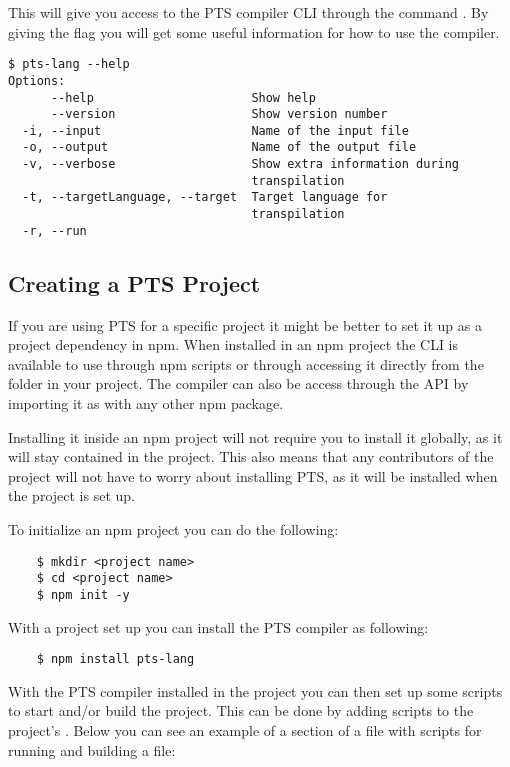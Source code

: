 This will give you access to the PTS compiler CLI through the command .
By giving the  flag you will get some useful information for how to use the compiler.

\begin{verbatim}
$ pts-lang --help
Options:
      --help                      Show help
      --version                   Show version number
  -i, --input                     Name of the input file
  -o, --output                    Name of the output file
  -v, --verbose                   Show extra information during
                                  transpilation
  -t, --targetLanguage, --target  Target language for
                                  transpilation
  -r, --run
\end{verbatim}

\subsection{Creating a PTS Project}\label{subsec:creating-a-pts-project}

If you are using PTS for a specific project it might be better to set it up as a project dependency in npm.
When installed in an npm project the CLI is available to use through npm scripts or through accessing it directly from the  folder in your project.
The compiler can also be access through the API by importing it as with any other npm package.

Installing it inside an npm project will not require you to install it globally, as it will stay contained in the project.
This also means that any contributors of the project will not have to worry about installing PTS, as it will be installed when the project is set up.

To initialize an npm project you can do the following:

\begin{verbatim}
    $ mkdir <project name>
    $ cd <project name>
    $ npm init -y
\end{verbatim}

With a project set up you can install the PTS compiler as following:

\begin{verbatim}
    $ npm install pts-lang
\end{verbatim}

With the PTS compiler installed in the project you can then set up some scripts to start and/or build the project.
This can be done by adding scripts to the project's .
Below you can see an example of a section of a  file with scripts for running and building a file:

